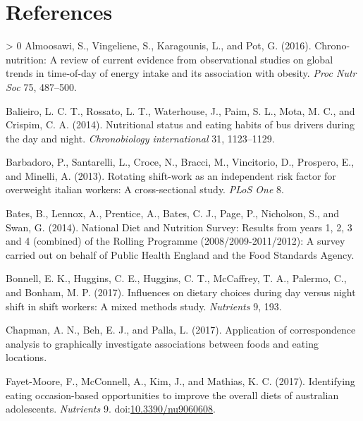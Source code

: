 \documentclass[utf8]{frontiersSCNS}
\newlength{\cslhangindent}
\newenvironment{CSLReferences}[3] %
 {%
  \setlength{\parindent}{0pt}
  \ifodd #1 \everypar{\setlength{\hangindent}{\cslhangindent}}\ignorespaces\fi
  \ifnum #2 > 0
  \setlength{\parskip}{#2\baselineskip}
  \fi
 }%
 {}
\begin{document}
\newpage

\hypertarget{references}{%
\section*{References}\label{references}}

\hypertarget{refs}{}
\begin{CSLReferences}{1}{0}
\leavevmode\hypertarget{ref-almoosawi2016chrono}{}%
Almoosawi, S., Vingeliene, S., Karagounis, L., and Pot, G. (2016).
Chrono-nutrition: A review of current evidence from observational
studies on global trends in time-of-day of energy intake and its
association with obesity. \emph{Proc Nutr Soc} 75, 487--500.

\leavevmode\hypertarget{ref-balieiro2014nutritional}{}%
Balieiro, L. C. T., Rossato, L. T., Waterhouse, J., Paim, S. L., Mota,
M. C., and Crispim, C. A. (2014). Nutritional status and eating habits
of bus drivers during the day and night. \emph{Chronobiology
international} 31, 1123--1129.

\leavevmode\hypertarget{ref-barbadoro2013rotating}{}%
Barbadoro, P., Santarelli, L., Croce, N., Bracci, M., Vincitorio, D.,
Prospero, E., and Minelli, A. (2013). Rotating shift-work as an
independent risk factor for overweight italian workers: A
cross-sectional study. \emph{PLoS One} 8.

\leavevmode\hypertarget{ref-bates2014national}{}%
Bates, B., Lennox, A., Prentice, A., Bates, C. J., Page, P., Nicholson,
S., and Swan, G. (2014). National {D}iet and {N}utrition {S}urvey:
Results from years 1, 2, 3 and 4 (combined) of the {R}olling {P}rogramme
(2008/2009-2011/2012): A survey carried out on behalf of {P}ublic
{H}ealth {E}ngland and the {F}ood {S}tandards {A}gency.

\leavevmode\hypertarget{ref-bonnell2017influences}{}%
Bonnell, E. K., Huggins, C. E., Huggins, C. T., McCaffrey, T. A.,
Palermo, C., and Bonham, M. P. (2017). Influences on dietary choices
during day versus night shift in shift workers: A mixed methods study.
\emph{Nutrients} 9, 193.

\leavevmode\hypertarget{ref-Chapman2017}{}%
Chapman, A. N., Beh, E. J., and Palla, L. (2017). Application of
correspondence analysis to graphically investigate associations between
foods and eating locations.

\leavevmode\hypertarget{ref-FayetMoore2017}{}%
Fayet-Moore, F., McConnell, A., Kim, J., and Mathias, K. C. (2017).
Identifying eating occasion-based opportunities to improve the overall
diets of australian adolescents. \emph{Nutrients} 9.
doi:\href{https://doi.org/10.3390/nu9060608}{10.3390/nu9060608}.


\end{CSLReferences}
\end{document}
